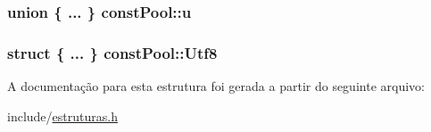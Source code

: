 \subsubsection[{\texorpdfstring{u}{u}}]{\setlength{\rightskip}{0pt plus 5cm}union \{ ... \}   const\+Pool\+::u}\hypertarget{structconst_pool_ab327fbd2fec182d523b180c4d941d7f5}{}\label{structconst_pool_ab327fbd2fec182d523b180c4d941d7f5}
\subsubsection[{\texorpdfstring{Utf8}{Utf8}}]{\setlength{\rightskip}{0pt plus 5cm}struct \{ ... \}   const\+Pool\+::\+Utf8}\hypertarget{structconst_pool_ab18ebde1a84b99d3dc0b70b1df46be82}{}\label{structconst_pool_ab18ebde1a84b99d3dc0b70b1df46be82}


A documentação para esta estrutura foi gerada a partir do seguinte arquivo\+:\begin{DoxyCompactItemize}
\item 
include/\hyperlink{estruturas_8h}{estruturas.\+h}\end{DoxyCompactItemize}
